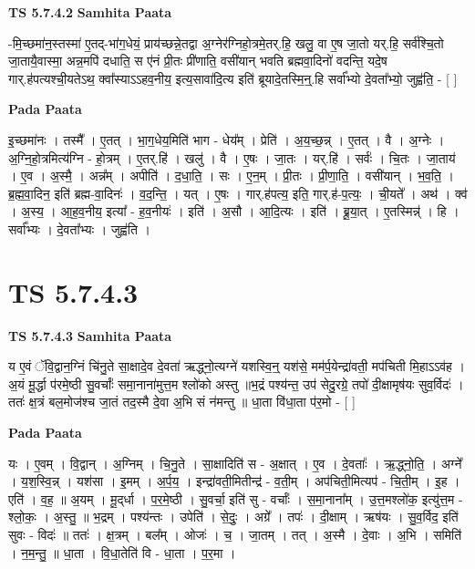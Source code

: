\documentclass[17pt]{extarticle}
\begin{document}
\textbf{TS 5.7.4.2 } \newline
\textbf{Samhita Paata} \newline

-मि॒च्छमा॑न॒स्तस्मा॑ ए॒तद्-भा॑ग॒धेयं॒ प्राय॑च्छन्ने॒तद्वा अ॒ग्नेर॑ग्निहो॒त्रमे॒तर्.हि॒ खलु॒ वा ए॒ष जा॒तो यर्.हि॒ सर्व॑श्चि॒तो जा॒तायै॒वास्मा॒ अन्न॒मपि॑ दधाति॒ स ए॑नं प्री॒तः प्री॑णाति॒ वसी॑यान् भवति ब्रह्मवा॒दिनो॑ वदन्ति॒ यदे॒ष गार्.ह॑पत्यश्ची॒यतेऽथ॒ क्वा᳚स्याऽऽहव॒नीय॒ इत्य॒सावा॑दि॒त्य इति॑ ब्रूयादे॒तस्मि॒न्॒.हि सर्वा᳚भ्यो दे॒वता᳚भ्यो॒ जुह्व॑ति॒ - [  ] \newline

\textbf{Pada Paata} \newline

इ॒च्छमा॑नः । तस्मै᳚ । ए॒तत् । भा॒ग॒धेय॒मिति॑ भाग - धेय᳚म् । प्रेति॑ । अ॒य॒च्छ॒न्न् । ए॒तत् । वै । अ॒ग्नेः । अ॒ग्नि॒हो॒त्रमित्य॑ग्नि - हो॒त्रम् । ए॒तर्.हि॑ । खलु॑ । वै । ए॒षः । जा॒तः । यर्.हि॑ । सर्वः॑ । चि॒तः । जा॒ताय॑ । ए॒व । अ॒स्मै॒ । अन्न᳚म् । अपीति॑ । द॒धा॒ति॒ । सः । ए॒न॒म् । प्री॒तः । प्री॒णा॒ति॒ । वसी॑यान् । भ॒व॒ति॒ । ब्र॒ह्म॒वा॒दिन॒ इति॑ ब्रह्म-वा॒दिनः॑ । व॒द॒न्ति॒ । यत् । ए॒षः । गार्.ह॑पत्य॒ इति॒ गार्.ह॑-प॒त्यः॒ । ची॒यते᳚ । अथ॑ । क्व॑ । अ॒स्य॒ । आ॒ह॒व॒नीय॒ इत्या᳚ -   ह॒व॒नीयः॑ । इति॑ । अ॒सौ । आ॒दि॒त्यः । इति॑ । ब्रू॒या॒त् । ए॒तस्मिन्न्॑ । हि । सर्वा᳚भ्यः । दे॒वता᳚भ्यः । जुह्व॑ति ।  \newline





\section{ TS 5.7.4.3 }

\textbf{TS 5.7.4.3 } \newline
\textbf{Samhita Paata} \newline

य ए॒वं ॅवि॒द्वान॒ग्निं चि॑नु॒ते सा॒क्षादे॒व दे॒वता॑ ऋद्ध्नो॒त्यग्ने॑ यशस्वि॒न्॒ यश॑से॒ मम॑र्प॒येन्द्रा॑वती॒ मप॑चिती मि॒हाऽऽव॑ह । अ॒यं मू॒र्द्धा प॑रमे॒ष्ठी सु॒वर्चाः᳚ समा॒नाना॑मुत्त॒म श्लो॑को अस्तु ॥भ॒द्रं पश्य॑न्त॒ उप॑ सेदु॒रग्रे॒ तपो॑ दी॒क्षामृष॑यः सुव॒र्विदः॑ । ततः॑ क्ष॒त्रं बल॒मोज॑श्च जा॒तं तद॒स्मै दे॒वा अ॒भि सं न॑मन्तु ॥ धा॒ता वि॑धा॒ता प॑र॒मो - [  ] \newline

\textbf{Pada Paata} \newline

यः । ए॒वम् । वि॒द्वान् । अ॒ग्निम् । चि॒नु॒ते । सा॒क्षादिति॑ स - अ॒क्षात् । ए॒व । दे॒वताः᳚ । ऋ॒द्ध्नो॒ति॒ । अग्ने᳚ । य॒श॒स्वि॒न्न् । यश॑सा । इ॒मम् । अ॒र्प॒य॒ । इन्द्रा॑वती॒मितीन्द्र॑ - व॒ती॒म् । अप॑चिती॒मित्यप॑ - चि॒ती॒म् । इ॒ह । एति॑ । व॒ह॒ ॥ अ॒यम् । मू॒द्‌र्धा । प॒र॒मे॒ष्ठी । सु॒वर्चा॒ इति॑ सु - वर्चाः᳚ । स॒मा॒नाना᳚म् । उ॒त्त॒मश्लो॑क॒ इत्यु॑त्त॒म - श्लो॒कः॒ । अ॒स्तु॒ ॥ भ॒द्रम् । पश्य॑न्तः । उपेति॑ । से॒दुः॒ । अग्रे᳚ । तपः॑ । दी॒क्षाम् । ऋष॑यः । सु॒व॒र्विद॒ इति॑ सुवः - विदः॑ ॥ ततः॑ । क्ष॒त्रम् । बल᳚म् । ओजः॑ । च॒ । जा॒तम् । तत् । अ॒स्मै । दे॒वाः । अ॒भि । समिति॑ । न॒म॒न्तु॒ ॥ धा॒ता । वि॒धा॒तेति॑ वि - धा॒ता । प॒र॒मा ।  \newline
\end{document}
